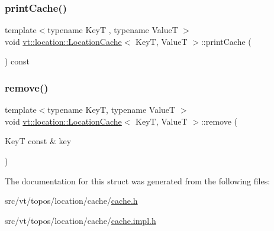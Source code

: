 \mbox{\label{structvt_1_1location_1_1_location_cache_a0c8f06fd5c1ff26c30c0c25b5800ba30}} 
\subsubsection{\texorpdfstring{print\+Cache()}{printCache()}}
{\footnotesize\ttfamily template$<$typename KeyT , typename ValueT $>$ \\
void \hyperlink{structvt_1_1location_1_1_location_cache}{vt\+::location\+::\+Location\+Cache}$<$ KeyT, ValueT $>$\+::print\+Cache (\begin{DoxyParamCaption}{ }\end{DoxyParamCaption}) const}

\mbox{\label{structvt_1_1location_1_1_location_cache_ac39441e200c3c3023bda193f7075f372}} 
\subsubsection{\texorpdfstring{remove()}{remove()}}
{\footnotesize\ttfamily template$<$typename KeyT, typename ValueT $>$ \\
void \hyperlink{structvt_1_1location_1_1_location_cache}{vt\+::location\+::\+Location\+Cache}$<$ KeyT, ValueT $>$\+::remove (\begin{DoxyParamCaption}\item[{KeyT const \&}]{key }\end{DoxyParamCaption})}



The documentation for this struct was generated from the following files\+:\begin{DoxyCompactItemize}
\item 
src/vt/topos/location/cache/\hyperlink{cache_8h}{cache.\+h}\item 
src/vt/topos/location/cache/\hyperlink{cache_8impl_8h}{cache.\+impl.\+h}\end{DoxyCompactItemize}
